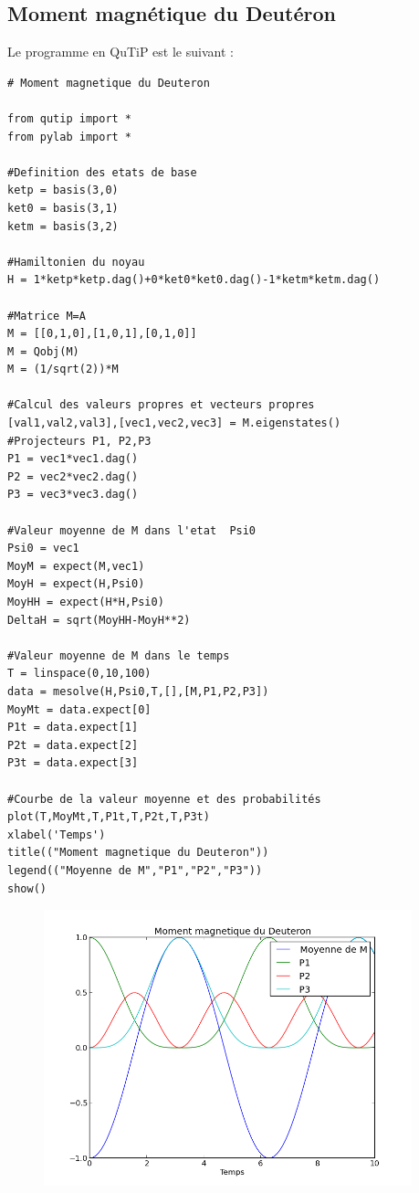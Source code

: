 \documentclass[a4paper,12pt]{book}
\numberwithin{equation}{section}
\begin{document}
\subsection{Moment magnétique du Deutéron}
Le programme en QuTiP est le suivant :
\begin{lstlisting}
# Moment magnetique du Deuteron

from qutip import *
from pylab import *

#Definition des etats de base
ketp = basis(3,0)
ket0 = basis(3,1)
ketm = basis(3,2)

#Hamiltonien du noyau
H = 1*ketp*ketp.dag()+0*ket0*ket0.dag()-1*ketm*ketm.dag()

#Matrice M=A
M = [[0,1,0],[1,0,1],[0,1,0]]
M = Qobj(M)
M = (1/sqrt(2))*M

#Calcul des valeurs propres et vecteurs propres
[val1,val2,val3],[vec1,vec2,vec3] = M.eigenstates()
#Projecteurs P1, P2,P3
P1 = vec1*vec1.dag()
P2 = vec2*vec2.dag()
P3 = vec3*vec3.dag()

#Valeur moyenne de M dans l'etat  Psi0
Psi0 = vec1
MoyM = expect(M,vec1)
MoyH = expect(H,Psi0)
MoyHH = expect(H*H,Psi0)
DeltaH = sqrt(MoyHH-MoyH**2)

#Valeur moyenne de M dans le temps
T = linspace(0,10,100)
data = mesolve(H,Psi0,T,[],[M,P1,P2,P3])
MoyMt = data.expect[0]
P1t = data.expect[1]
P2t = data.expect[2]
P3t = data.expect[3]

#Courbe de la valeur moyenne et des probabilités
plot(T,MoyMt,T,P1t,T,P2t,T,P3t)
xlabel('Temps')
title(("Moment magnetique du Deuteron"))
legend(("Moyenne de M","P1","P2","P3"))
show()

\end{lstlisting}

\begin{figure}[!h]
\begin{center}
\includegraphics[height=8cm]{Images/NoyauDeuteron.png}
\end{center}
\end{figure}
\end{document}
